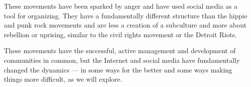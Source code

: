 These movements have been sparked by anger and have used social media as a tool for organizing. They have a fundamentally different structure than the hippie and punk rock movements and are less a creation of a subculture and more about rebellion or uprising, similar to the civil rights movement or the Detroit Riots.

These movements have the successful, active management and development of communities in common, but the Internet and social media have fundamentally changed the dynamics --- in some ways for the better and some ways making things more difficult, as we will explore.
